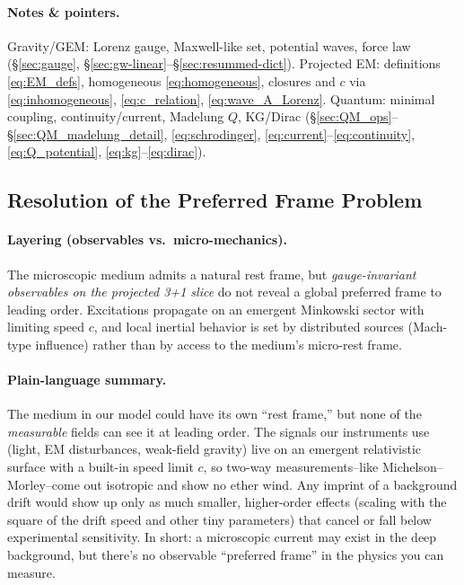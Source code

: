 \paragraph*{Notes \& pointers.}
Gravity/GEM: Lorenz gauge, Maxwell-like set, potential waves, force law (\S\ref{sec:gauge}, \S\ref{sec:gw-linear}–\S\ref{sec:resummed-dict}).\;
Projected EM: definitions \eqref{eq:EM_defs}, homogeneous \eqref{eq:homogeneous}, closures and $c$ via \eqref{eq:inhomogeneous}, \eqref{eq:c_relation}, \eqref{eq:wave_A_Lorenz}.\;
Quantum: minimal coupling, continuity/current, Madelung \(Q\), KG/Dirac (\S\ref{sec:QM_ops}–\S\ref{sec:QM_madelung_detail}, \eqref{eq:schrodinger}, \eqref{eq:current}–\eqref{eq:continuity}, \eqref{eq:Q_potential}, \eqref{eq:kg}–\eqref{eq:dirac}).



\subsection{Resolution of the Preferred Frame Problem}
\label{subsec:preferred-frame}

\paragraph*{Layering (observables vs.\ micro-mechanics).}
The microscopic medium admits a natural rest frame, but \emph{gauge-invariant observables on the projected 3+1 slice} do not reveal a global preferred frame to leading order. Excitations propagate on an emergent Minkowski sector with limiting speed $c$, and local inertial behavior is set by distributed sources (Mach-type influence) rather than by access to the medium's micro-rest frame.

\paragraph*{Plain-language summary.} The medium in our model could have its own “rest frame,” but none of the \emph{measurable} fields can see it at leading order. The signals our instruments use (light, EM disturbances, weak-field gravity) live on an emergent relativistic surface with a built-in speed limit $c$, so two-way measurements--like Michelson–Morley--come out isotropic and show no ether wind. Any imprint of a background drift would show up only as much smaller, higher-order effects (scaling with the square of the drift speed and other tiny parameters) that cancel or fall below experimental sensitivity. In short: a microscopic current may exist in the deep background, but there's no observable “preferred frame” in the physics you can measure.

